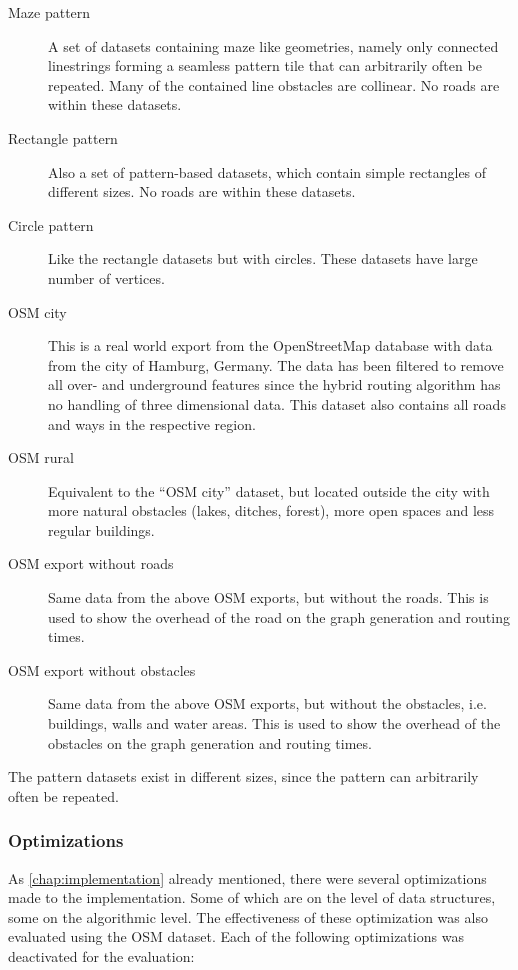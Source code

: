 			\begin{description}
				\item[Maze pattern] A set of datasets containing maze like geometries, namely only connected linestrings forming a seamless pattern tile that can arbitrarily often be repeated. Many of the contained line obstacles are collinear. No roads are within these datasets.
				\item[Rectangle pattern] Also a set of pattern-based datasets, which contain simple rectangles of different sizes. No roads are within these datasets.
				\item[Circle pattern] Like the rectangle datasets but with circles. These datasets have large number of vertices.
				\item[OSM city] This is a real world export from the OpenStreetMap database with data from the city of Hamburg, Germany. The data has been filtered to remove all over- and underground features since the hybrid routing algorithm has no handling of three dimensional data. This dataset also contains all roads and ways in the respective region.
				\item[OSM rural] Equivalent to the \enquote{OSM city} dataset, but located outside the city with more natural obstacles (lakes, ditches, forest), more open spaces and less regular buildings.
				\item[OSM export without roads] Same data from the above OSM exports, but without the roads. This is used to show the overhead of the road on the graph generation and routing times.
				\item[OSM export without obstacles] Same data from the above OSM exports, but without the obstacles, i.e. buildings, walls and water areas. This is used to show the overhead of the obstacles on the graph generation and routing times.
			\end{description}
			
			The pattern datasets exist in different sizes, since the pattern can arbitrarily often be repeated.
			
			
		
		\subsubsection{Optimizations}
		
			As \cref{chap:implementation} already mentioned, there were several optimizations made to the implementation.
			Some of which are on the level of data structures, some on the algorithmic level.
			The effectiveness of these optimization was also evaluated using the OSM dataset.
			Each of the following optimizations was deactivated for the evaluation:

